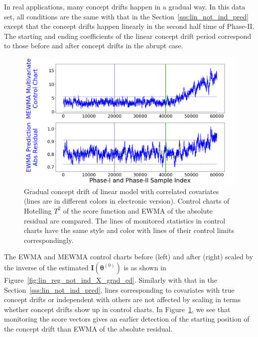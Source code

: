 \documentclass[twoside,11pt]{article}
\begin{document}
\begin{enumerate}[(I)]
In real applications, many concept drifts happen in a gradual way. In this data set, all conditions are the same with that in the Section~\ref{sss:lin_not_ind_pred} except that the concept drifts happen linearly in the second half time of Phase-II. The starting and ending coefficients of the linear concept drift period correspond to those before and after concept drifts in the abrupt case. 
\begin{figure}[!htbp]
\centering
\includegraphics[width = 0.6\linewidth]{../figures/v14/sim_6/reg/1_sim6_lin_1e-08_0_005_1.png}
  \caption{Gradual concept drift of linear model with correlated covariates (lines are in different colors in electronic version). Control charts of Hotelling $T^2$ of the score function and EWMA of the absolute residual are compared. The lines of monitored statistics in control charts have the same style and color with lines of their control limits correspondingly.}
  \label{fig:lin_reg_ind_X_grad_cd_comp}
\end{figure}

The EWMA and MEWMA control charts before (left) and after (right) scaled by {the inverse of the estimated} ${\mathbf {I}}(\bm { \theta}^{(0)})$ is as shown in Figure~\ref{fig:lin_reg_not_ind_X_grad_cd}. Similarly with that in the Section~\ref{sss:lin_not_ind_pred}, lines corresponding to covariates with true concept drifts or independent with others are not affected by scaling in terms whether concept drifts show up in control charts. In Figure~\ref{fig:lin_reg_ind_X_grad_cd_comp}, we see that monitoring the score vectors gives an earlier detection of the starting position of the concept drift than EWMA of the absolute residual.
\end{enumerate}
\end{document}
